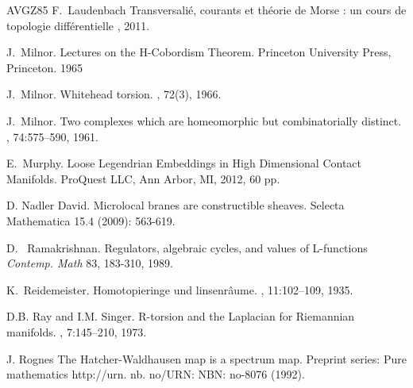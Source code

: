 \documentclass{amsart}
\theoremstyle{definition}
\theoremstyle{remark}
\newtheorem{inductive lemma}[theorem]{Inductive Lemma}
\begin{document}
\begin{thebibliography}{AVGZ85}
F.~Laudenbach
\newblock Transversali\'e, courants et th\'eorie de Morse : un cours de topologie diff\'erentielle
, 2011.


J.~Milnor.
\newblock Lectures on the H-Cobordism Theorem. 
\newblock Princeton University Press, Princeton. 1965

J.~Milnor.
\newblock Whitehead torsion.
, 72(3), 1966.






J.~Milnor.
\newblock Two complexes which are homeomorphic but combinatorially distinct.
, 74:575–590, 1961.

E.~Murphy.
\newblock Loose Legendrian Embeddings in High Dimensional Contact Manifolds.
\newblock ProQuest LLC, Ann Arbor, MI, 2012, 60 pp.

D. Nadler
\newblock David. Microlocal branes are constructible sheaves.
\newblock Selecta Mathematica 15.4 (2009): 563-619.



\newblock D.~ Ramakrishnan.
\newblock Regulators, algebraic cycles, and values of L-functions
\newblock
{\em Contemp. Math} 83, 183-310, 1989.

K.~Reidemeister.
\newblock Homotopieringe und linsenr\^aume.
, 11:102--109, 1935.


D.B. Ray and I.M. Singer.
\newblock R-torsion and the Laplacian for Riemannian manifolds.
, 7:145–210, 1973.

J. Rognes
\newblock The Hatcher-Waldhausen map is a spectrum map.
\newblock Preprint series: Pure mathematics http://urn. nb. no/URN: NBN: no-8076 (1992).






\end{thebibliography}
\end{document}
